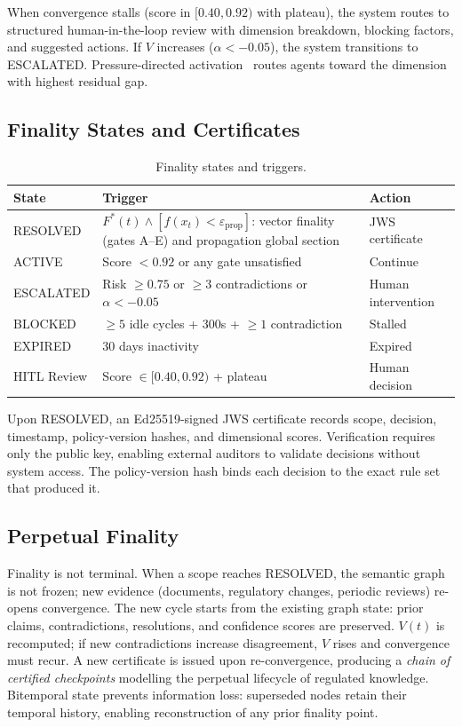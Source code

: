 \documentclass[11pt]{article}
\begin{document}
When convergence stalls (score in $[0.40, 0.92)$ with plateau), the system routes to structured human-in-the-loop review with dimension breakdown, blocking factors, and suggested actions.
If $V$ increases ($\alpha < -0.05$), the system transitions to ESCALATED.
Pressure-directed activation~\cite{dorigo2000} routes agents toward the dimension with highest residual gap.

\subsection{Finality States and Certificates}

\begin{table}[H]
\centering
\small
\begin{tabular}{lp{6.5cm}l}
\toprule
\textbf{State} & \textbf{Trigger} & \textbf{Action} \\
\midrule
RESOLVED & $F^*(t) \wedge [f(x_t) < \varepsilon_{\mathrm{prop}}]$: vector finality (gates A--E) and propagation global section & JWS certificate \\
ACTIVE & Score $< 0.92$ or any gate unsatisfied & Continue \\
ESCALATED & Risk $\geq 0.75$ or $\geq 3$ contradictions or $\alpha < {-}0.05$ & Human intervention \\
BLOCKED & $\geq 5$ idle cycles + 300s + $\geq 1$ contradiction & Stalled \\
EXPIRED & 30 days inactivity & Expired \\
HITL Review & Score $\in [0.40, 0.92)$ + plateau & Human decision \\
\bottomrule
\end{tabular}
\caption{Finality states and triggers.}
\label{tab:finality}
\end{table}

Upon RESOLVED, an Ed25519-signed JWS certificate records scope, decision, timestamp, policy-version hashes, and dimensional scores.
Verification requires only the public key, enabling external auditors to validate decisions without system access.
The policy-version hash binds each decision to the exact rule set that produced it.

\subsection{Perpetual Finality}
\label{sec:perpetual-finality}

Finality is not terminal.
When a scope reaches RESOLVED, the semantic graph is not frozen; new evidence (documents, regulatory changes, periodic reviews) re-opens convergence.
The new cycle starts from the existing graph state: prior claims, contradictions, resolutions, and confidence scores are preserved.
$V(t)$ is recomputed; if new contradictions increase disagreement, $V$ rises and convergence must recur.
A new certificate is issued upon re-convergence, producing a \emph{chain of certified checkpoints} modelling the perpetual lifecycle of regulated knowledge.
Bitemporal state prevents information loss: superseded nodes retain their temporal history, enabling reconstruction of any prior finality point.
\end{document}
